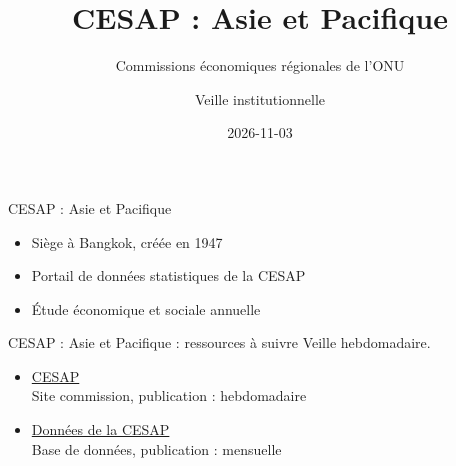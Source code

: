 \documentclass[aspectratio=169,11pt]{beamer}
\title{CESAP : Asie et Pacifique}
\subtitle{Commissions économiques régionales de l'ONU}
\author{Veille institutionnelle}
\date{2026-11-03}
\begin{document}
\begin{frame}\titlepage\end{frame}

\begin{frame}{CESAP : Asie et Pacifique}
\begin{itemize}
\item Siège à Bangkok, créée en 1947
\item Portail de données statistiques de la CESAP
\item Étude économique et sociale annuelle
\end{itemize}
\end{frame}

\begin{frame}{CESAP : Asie et Pacifique : ressources à suivre}
\small
Veille hebdomadaire.
\begin{itemize}
\item \href{https://www.unescap.org}{CESAP}\\{\footnotesize Site commission, publication : hebdomadaire}
\item \href{https://data.unescap.org}{Données de la CESAP}\\{\footnotesize Base de données, publication : mensuelle}
\end{itemize}
\end{frame}
\end{document}

